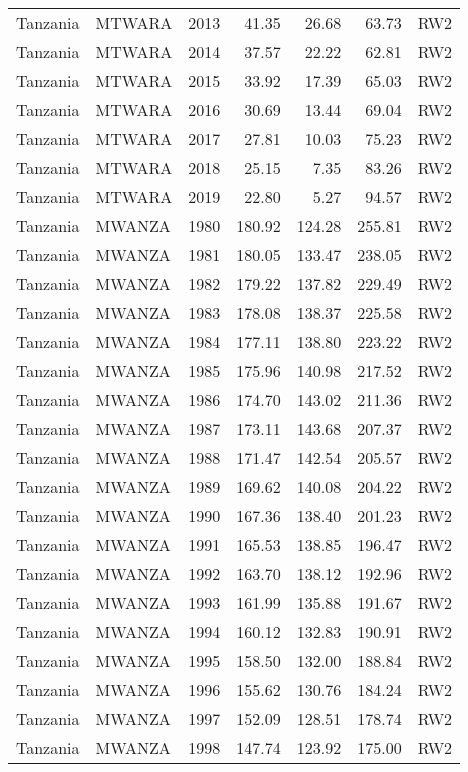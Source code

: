 \begin{longtable}{lllrrrl}
  Tanzania & MTWARA & 2013 & 41.35 & 26.68 & 63.73 & RW2 \\ 
  Tanzania & MTWARA & 2014 & 37.57 & 22.22 & 62.81 & RW2 \\ 
  Tanzania & MTWARA & 2015 & 33.92 & 17.39 & 65.03 & RW2 \\ 
  Tanzania & MTWARA & 2016 & 30.69 & 13.44 & 69.04 & RW2 \\ 
  Tanzania & MTWARA & 2017 & 27.81 & 10.03 & 75.23 & RW2 \\ 
  Tanzania & MTWARA & 2018 & 25.15 & 7.35 & 83.26 & RW2 \\ 
  Tanzania & MTWARA & 2019 & 22.80 & 5.27 & 94.57 & RW2 \\ 
  Tanzania & MWANZA & 1980 & 180.92 & 124.28 & 255.81 & RW2 \\ 
  Tanzania & MWANZA & 1981 & 180.05 & 133.47 & 238.05 & RW2 \\ 
  Tanzania & MWANZA & 1982 & 179.22 & 137.82 & 229.49 & RW2 \\ 
  Tanzania & MWANZA & 1983 & 178.08 & 138.37 & 225.58 & RW2 \\ 
  Tanzania & MWANZA & 1984 & 177.11 & 138.80 & 223.22 & RW2 \\ 
  Tanzania & MWANZA & 1985 & 175.96 & 140.98 & 217.52 & RW2 \\ 
  Tanzania & MWANZA & 1986 & 174.70 & 143.02 & 211.36 & RW2 \\ 
  Tanzania & MWANZA & 1987 & 173.11 & 143.68 & 207.37 & RW2 \\ 
  Tanzania & MWANZA & 1988 & 171.47 & 142.54 & 205.57 & RW2 \\ 
  Tanzania & MWANZA & 1989 & 169.62 & 140.08 & 204.22 & RW2 \\ 
  Tanzania & MWANZA & 1990 & 167.36 & 138.40 & 201.23 & RW2 \\ 
  Tanzania & MWANZA & 1991 & 165.53 & 138.85 & 196.47 & RW2 \\ 
  Tanzania & MWANZA & 1992 & 163.70 & 138.12 & 192.96 & RW2 \\ 
  Tanzania & MWANZA & 1993 & 161.99 & 135.88 & 191.67 & RW2 \\ 
  Tanzania & MWANZA & 1994 & 160.12 & 132.83 & 190.91 & RW2 \\ 
  Tanzania & MWANZA & 1995 & 158.50 & 132.00 & 188.84 & RW2 \\ 
  Tanzania & MWANZA & 1996 & 155.62 & 130.76 & 184.24 & RW2 \\ 
  Tanzania & MWANZA & 1997 & 152.09 & 128.51 & 178.74 & RW2 \\ 
  Tanzania & MWANZA & 1998 & 147.74 & 123.92 & 175.00 & RW2 \\ 

\end{longtable}
